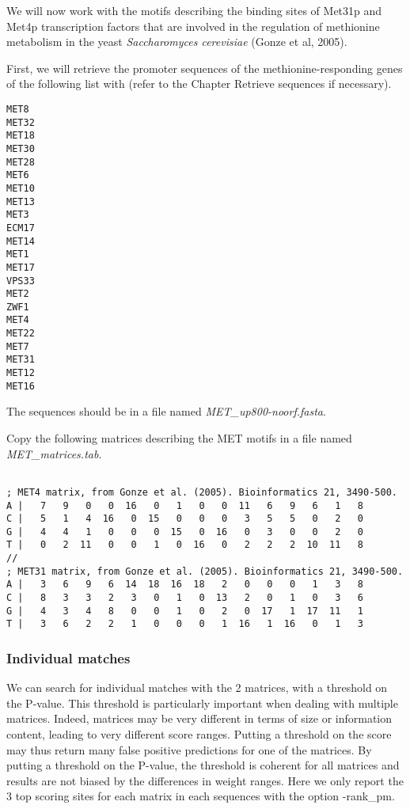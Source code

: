 We will now work with the motifs describing the binding sites of Met31p and Met4p transcription factors that are involved in the regulation of methionine metabolism in the yeast \textit{Saccharomyces cerevisiae} (Gonze et al, 2005).

First, we will retrieve the promoter sequences of the methionine-responding genes of the following list with  (refer to the Chapter Retrieve sequences if necessary).

{\color{Blue} \begin{footnotesize} 
\begin{verbatim}
MET8
MET32
MET18
MET30
MET28
MET6
MET10
MET13
MET3
ECM17
MET14
MET1
MET17
VPS33
MET2
ZWF1
MET4
MET22
MET7
MET31
MET12
MET16
\end{verbatim} \end{footnotesize}
}

The sequences should be in a file named \textit{MET\_up800-noorf.fasta}.

Copy the following matrices describing the MET motifs in a file named  \textit{MET\_matrices.tab}.

{\color{Blue} \begin{footnotesize} 
\begin{verbatim}

; MET4 matrix, from Gonze et al. (2005). Bioinformatics 21, 3490-500.
A |   7   9   0   0  16   0   1   0   0  11   6   9   6   1   8
C |   5   1   4  16   0  15   0   0   0   3   5   5   0   2   0
G |   4   4   1   0   0   0  15   0  16   0   3   0   0   2   0
T |   0   2  11   0   0   1   0  16   0   2   2   2  10  11   8
//
; MET31 matrix, from Gonze et al. (2005). Bioinformatics 21, 3490-500.
A |   3   6   9   6  14  18  16  18   2   0   0   0   1   3   8
C |   8   3   3   2   3   0   1   0  13   2   0   1   0   3   6
G |   4   3   4   8   0   0   1   0   2   0  17   1  17  11   1
T |   3   6   2   2   1   0   0   0   1  16   1  16   0   1   3
\end{verbatim} \end{footnotesize}
}

\subsubsection{Individual matches}

We can search for individual matches with the 2 matrices, with a threshold on the P-value. This threshold is particularly important when dealing with multiple matrices. Indeed, matrices may be very different in terms of size or information content, leading to very different score ranges. Putting a threshold on the score may thus return many false positive predictions for one of the matrices. By putting a threshold on the P-value, the threshold is coherent for all matrices and results are not biased by the differences in weight ranges. Here we only report the 3 top scoring sites for each matrix in each sequences  with the option -rank\_pm.

